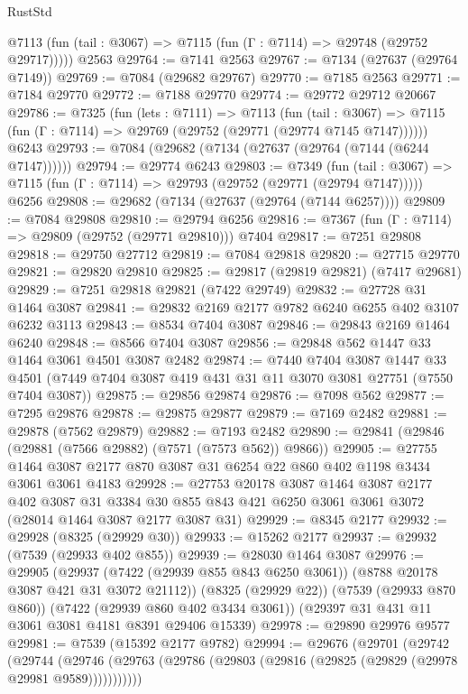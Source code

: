 \begin{lexlean}{RustStd}
\begin{coremodule}
      @7113 (fun (tail : @3067) => @7115 (fun (Γ : @7114) => @29748 (@29752 @29717)))))
    @2563
@29764 := @7141 @2563
@29767 := @7134 (@27637 (@29764 @7149))
@29769 := @7084 (@29682 @29767)
@29770 := @7185 @2563
@29771 := @7184 @29770
@29772 := @7188 @29770
@29774 := @29772 @29712 @20667
@29786 := @7325
    (fun (lets : @7111) =>
    @7113
      (fun (tail : @3067) =>
      @7115 (fun (Γ : @7114) => @29769 (@29752 (@29771 (@29774 @7145 @7147))))))
    @6243
@29793 := @7084 (@29682 (@7134 (@27637 (@29764 (@7144 (@6244 @7147))))))
@29794 := @29774 @6243
@29803 := @7349
    (fun (tail : @3067) => @7115 (fun (Γ : @7114) => @29793 (@29752 (@29771 (@29794 @7147)))))
    @6256
@29808 := @29682 (@7134 (@27637 (@29764 (@7144 @6257))))
@29809 := @7084 @29808
@29810 := @29794 @6256
@29816 := @7367 (fun (Γ : @7114) => @29809 (@29752 (@29771 @29810))) @7404
@29817 := @7251 @29808
@29818 := @29750 @27712
@29819 := @7084 @29818
@29820 := @27715 @29770
@29821 := @29820 @29810
@29825 := @29817 (@29819 @29821) (@7417 @29681)
@29829 := @7251 @29818 @29821 (@7422 @29749)
@29832 := @27728 @31 @1464 @3087
@29841 := @29832 @2169 @2177 @9782 @6240 @6255 @402 @3107 @6232 @3113
@29843 := @8534 @7404 @3087
@29846 := @29843 @2169 @1464 @6240
@29848 := @8566 @7404 @3087
@29856 := @29848 @562 @1447 @33 @1464 @3061 @4501 @3087 @2482
@29874 := @7440
    @7404
    @3087
    @1447
    @33
    @4501
    (@7449 @7404 @3087 @419 @431 @31 @11 @3070 @3081 @27751 (@7550 @7404 @3087))
@29875 := @29856 @29874
@29876 := @7098 @562
@29877 := @7295 @29876
@29878 := @29875 @29877
@29879 := @7169 @2482
@29881 := @29878 (@7562 @29879)
@29882 := @7193 @2482
@29890 := @29841 (@29846 (@29881 (@7566 @29882) (@7571 (@7573 @562)) @9866))
@29905 := @27755 @1464 @3087 @2177 @870 @3087 @31 @6254 @22 @860 @402 @1198 @3434 @3061 @3061 @4183
@29928 := @27753
    @20178
    @3087
    @1464
    @3087
    @2177
    @402
    @3087
    @31
    @3384
    @30
    @855
    @843
    @421
    @6250
    @3061
    @3061
    @3072
    (@28014 @1464 @3087 @2177 @3087 @31)
@29929 := @8345 @2177
@29932 := @29928 (@8325 (@29929 @30))
@29933 := @15262 @2177
@29937 := @29932 (@7539 (@29933 @402 @855))
@29939 := @28030 @1464 @3087
@29976 := @29905
    (@29937 (@7422 (@29939 @855 @843 @6250 @3061)) (@8788 @20178 @3087 @421 @31 @3072 @21112))
    (@8325 (@29929 @22))
    (@7539 (@29933 @870 @860))
    (@7422 (@29939 @860 @402 @3434 @3061))
    (@29397 @31 @431 @11 @3061 @3081 @4181 @8391 @29406 @15339)
@29978 := @29890 @29976 @9577
@29981 := @7539 (@15392 @2177 @9782)
@29994 := @29676
    (@29701
      (@29742
        (@29744
          (@29746 (@29763 (@29786 (@29803 (@29816 (@29825 (@29829 (@29978 @29981 @9589)))))))))))

\end{coremodule}
\end{lexlean}
